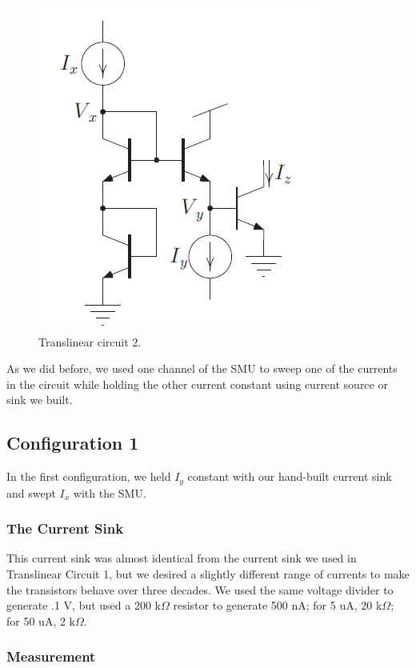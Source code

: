 \documentclass{article}
\begin{document}
\begin{figure}[H]
\begin{center}
\includegraphics[scale=.5]{tl2.png}
\caption{Translinear circuit 2.}
\label{fig:tl2}
\end{center}
\end{figure}

As we did before, we used one channel of the SMU to sweep one of the currents in the circuit while holding the other current constant using current source or sink we built.

\subsection*{Configuration 1}

In the first configuration, we held $I_y$ constant with our hand-built current sink and swept $I_x$ with the SMU.  

\subsubsection*{The Current Sink}

This current sink was almost identical from the current sink we used in Translinear Circuit 1, but we desired a slightly different range of currents to make the transistors behave over three decades.  We used the same voltage divider to generate .1 V, but used a 200 k$\Omega$ resistor to generate 500 nA; for 5 uA, 20 k$\Omega$; for 50 uA, 2 k$\Omega$.

\subsubsection*{Measurement}
\end{document}

